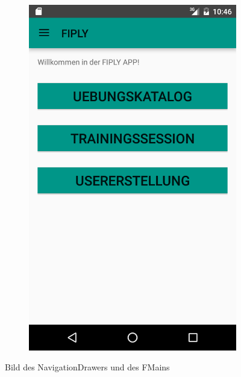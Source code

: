 \documentclass[FIPLY_base.tex]{subfiles}
\begin{document}
\begin{figure}
\begin{subfigure}[b]{0.3\textwidth}
	\includegraphics[scale=0.20]{img/MFragment}
	\end{subfigure}	
	\caption{Bild des NavigationDrawers und des FMains}
\end{figure}
\end{document}
